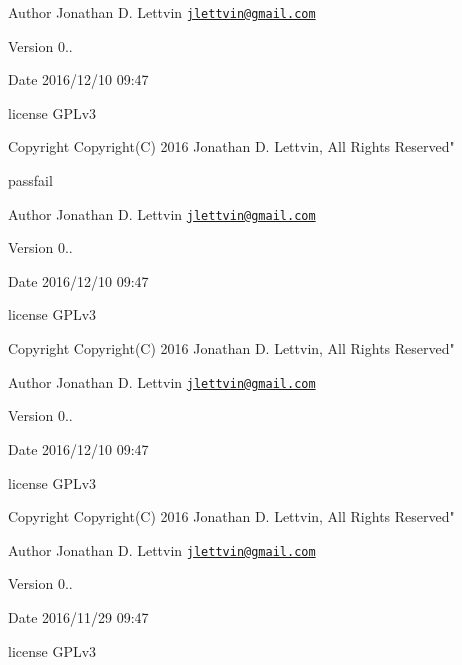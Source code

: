 \begin{DoxyAuthor}{Author}
Jonathan D. Lettvin \href{mailto:jlettvin@gmail.com}{\tt jlettvin@gmail.\+com}
\end{DoxyAuthor}
\begin{DoxyVersion}{Version}
0..
\end{DoxyVersion}
\begin{DoxyDate}{Date}
2016/12/10 09\+:47
\end{DoxyDate}
license G\+P\+Lv3

\begin{DoxyCopyright}{Copyright}
Copyright(\+C) 2016 Jonathan D. Lettvin, All Rights Reserved"
\end{DoxyCopyright}
passfail

\begin{DoxyAuthor}{Author}
Jonathan D. Lettvin \href{mailto:jlettvin@gmail.com}{\tt jlettvin@gmail.\+com}
\end{DoxyAuthor}
\begin{DoxyVersion}{Version}
0..
\end{DoxyVersion}
\begin{DoxyDate}{Date}
2016/12/10 09\+:47
\end{DoxyDate}
license G\+P\+Lv3

\begin{DoxyCopyright}{Copyright}
Copyright(\+C) 2016 Jonathan D. Lettvin, All Rights Reserved"
\end{DoxyCopyright}
\begin{DoxyAuthor}{Author}
Jonathan D. Lettvin \href{mailto:jlettvin@gmail.com}{\tt jlettvin@gmail.\+com}
\end{DoxyAuthor}
\begin{DoxyVersion}{Version}
0..
\end{DoxyVersion}
\begin{DoxyDate}{Date}
2016/12/10 09\+:47
\end{DoxyDate}
license G\+P\+Lv3

\begin{DoxyCopyright}{Copyright}
Copyright(\+C) 2016 Jonathan D. Lettvin, All Rights Reserved"
\end{DoxyCopyright}
\begin{DoxyAuthor}{Author}
Jonathan D. Lettvin \href{mailto:jlettvin@gmail.com}{\tt jlettvin@gmail.\+com}
\end{DoxyAuthor}
\begin{DoxyVersion}{Version}
0..
\end{DoxyVersion}
\begin{DoxyDate}{Date}
2016/11/29 09\+:47
\end{DoxyDate}
license G\+P\+Lv3

